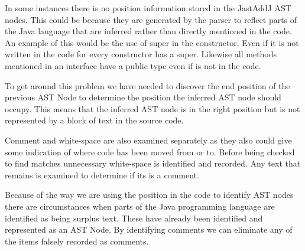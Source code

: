 
In some instances there is no position information stored in the JastAddJ AST nodes.  This could be because they are generated by the parser to reflect parts of the Java language that are inferred rather than directly mentioned in the code.  An example of this would be the use of super in the constructor.  Even if it is not written in the code for every constructor has a super. Likewise all methods mentioned in an interface have a public type even if is not in the code.

To get around this problem we have needed to discover the end position of the previous AST Node to determine the position the inferred AST node should occupy.  This means that the inferred AST node is in the right position but is not represented by a block of text in the source code. 


Comment and white-space are also examined separately as they also could give some indication of where code has been moved from or to.
Before being checked to find matches unnecessary white-space is identified and recorded.
Any text that remains is examined to determine if its is a comment. 

Because of the way we are using the position in the code to identify AST nodes there are circumstances when parts of the Java programming language are identified as being surplus text. These have already been identified and represented as an AST Node. By identifying comments we can eliminate any of the items falsely recorded as comments.


% 
% 

